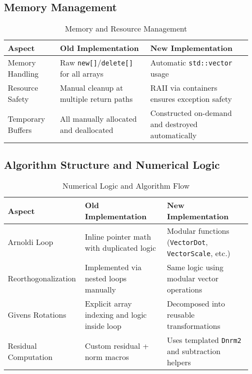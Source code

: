 \documentclass[12pt, titlepage]{article}
\begin{document}
\subsection*{Memory Management}

\begin{table}[H]
  \centering
  \begin{tabularx}{\linewidth}{%
    >{\raggedright\arraybackslash}l
    >{\raggedright\arraybackslash}X
    >{\raggedright\arraybackslash}X
    }
    \toprule
    \textbf{Aspect}         & \textbf{Old Implementation}                   & \textbf{New Implementation}                             \\
    \midrule
    Memory Handling   & Raw \texttt{new[]}/\texttt{delete[]} for all arrays & Automatic \texttt{std::vector} usage                    \\
    Resource Safety   & Manual cleanup at multiple return paths & RAII via containers ensures exception safety      \\
    Temporary Buffers & All manually allocated and deallocated  & Constructed on-demand and destroyed automatically \\
    \bottomrule
  \end{tabularx}
  \caption{Memory and Resource Management}
\end{table}

\subsection*{Algorithm Structure and Numerical Logic}

\begin{table}[H]
  \centering
  \begin{tabularx}{\linewidth}{%
    >{\raggedright\arraybackslash}l
    >{\raggedright\arraybackslash}X
    >{\raggedright\arraybackslash}X
    }
    \toprule
    \textbf{Aspect}            & \textbf{Old Implementation}                         & \textbf{New Implementation}                                  \\
    \midrule
    Arnoldi Loop         & Inline pointer math with duplicated logic     & Modular functions (\texttt{VectorDot}, \texttt{VectorScale}, etc.) \\
    Reorthogonalization  & Implemented via nested loops manually         & Same logic using modular vector operations             \\
    Givens Rotations     & Explicit array indexing and logic inside loop & Decomposed into reusable transformations               \\
    Residual Computation & Custom residual + norm macros                 & Uses templated \texttt{Dnrm2} and subtraction helpers        \\
    \bottomrule
  \end{tabularx}
  \caption{Numerical Logic and Algorithm Flow}
\end{table}
\end{document}
